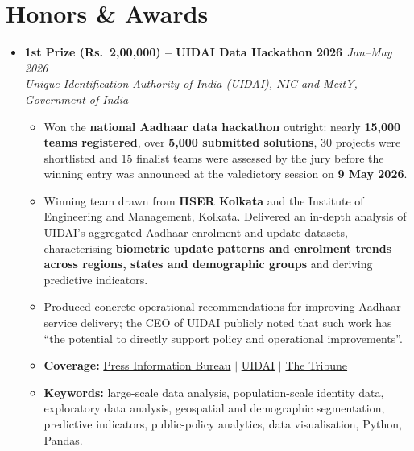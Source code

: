 \documentclass[a4paper,10pt]{article}
\newcommand{\resumeProject}[4]{
    \item\small{
        \textbf{#1} \hfill \textit{#2}\\
        \textit{#3}\\
        \begin{itemize}[leftmargin=1.5em,label=\textbullet,nosep,itemsep=0.5pt]
            #4
        \end{itemize}
    }\vspace{2pt}
}
\newcommand{\compactSection}[2]{
    \section{#1}
    \vspace{-0.1cm}
    #2
    \vspace{-0.2cm}
}
\begin{document}
\compactSection{Honors \& Awards}{
\begin{itemize}[leftmargin=*,label={},itemsep=4pt]

    \resumeProject{\textbf{1st Prize (Rs.~2,00,000) -- UIDAI Data Hackathon 2026} \href{https://event.data.gov.in/challenge/uidai-data-hackathon-2026/}{\faGlobe}}{Jan--May 2026}
    {Unique Identification Authority of India (UIDAI), NIC and MeitY, Government of India}
    {\item Won the \textbf{national Aadhaar data hackathon} outright: nearly \textbf{15,000 teams registered}, over \textbf{5,000 submitted solutions}, 30 projects were shortlisted and 15 finalist teams were assessed by the jury before the winning entry was announced at the valedictory session on \textbf{9 May 2026}.
    \item Winning team drawn from \textbf{IISER Kolkata} and the Institute of Engineering and Management, Kolkata. Delivered an in-depth analysis of UIDAI's aggregated Aadhaar enrolment and update datasets, characterising \textbf{biometric update patterns and enrolment trends across regions, states and demographic groups} and deriving predictive indicators.
    \item Produced concrete operational recommendations for improving Aadhaar service delivery; the CEO of UIDAI publicly noted that such work has ``the potential to directly support policy and operational improvements''.
    \item \textbf{Coverage:} \href{https://www.pib.gov.in/PressReleasePage.aspx?PRID=2259168}{\small Press Information Bureau} $\mid$ \href{https://uidai.gov.in/en/media-resources/media/aadhaar-in-prints/19821-uidai-data-hackathon-2026-showcases-data-driven-innovations-for-inclusive-governance.html}{\small UIDAI} $\mid$ \href{https://www.tribuneindia.com/news/business/uidai-data-hackathon-2026-highlights-student-led-digital-identity-innovations/}{\small The Tribune}
    \item \textbf{Keywords:} large-scale data analysis, population-scale identity data, exploratory data analysis, geospatial and demographic segmentation, predictive indicators, public-policy analytics, data visualisation, Python, Pandas.}

\end{itemize}
}
\end{document}
